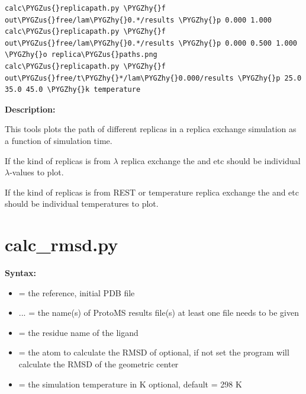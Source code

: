 \documentclass[letterpaper,10pt,english]{sphinxmanual}
\def\PYGZus{\char`\_}
\def\PYGZhy{\char`\-}
\begin{document}
\begin{Verbatim}[commandchars=\\\{\}]
calc\PYGZus{}replicapath.py \PYGZhy{}f out\PYGZus{}free/lam\PYGZhy{}0.*/results \PYGZhy{}p 0.000 1.000
calc\PYGZus{}replicapath.py \PYGZhy{}f out\PYGZus{}free/lam\PYGZhy{}0.*/results \PYGZhy{}p 0.000 0.500 1.000 \PYGZhy{}o replica\PYGZus{}paths.png
calc\PYGZus{}replicapath.py \PYGZhy{}f out\PYGZus{}free/t\PYGZhy{}*/lam\PYGZhy{}0.000/results \PYGZhy{}p 25.0 35.0 45.0 \PYGZhy{}k temperature
\end{Verbatim}

\textbf{Description:}

This tools plots the path of different replicas in a replica exchange simulation as a function of simulation time.

If the kind of replicas is from \(\lambda\) replica exchange the  and  etc should be individual \(\lambda\)-values to plot.

If the kind of replicas is from REST or temperature replica exchange the  and  etc should be individual temperatures to plot.


\section{calc\_rmsd.py}
\label{tools:calc-rmsd-py}
\textbf{Syntax:}

\begin{itemize}
\item {} 
 = the reference, initial PDB file

\item {} 
 ... = the name(s) of ProtoMS results file(s)
at least one file needs to be given

\item {} 
 = the residue name of the ligand

\item {} 
 = the atom to calculate the RMSD of
optional, if not set the program will calculate the RMSD of the geometric center

\item {} 
 = the simulation temperature in K
optional, default = 298 K

\end{itemize}
\end{document}
